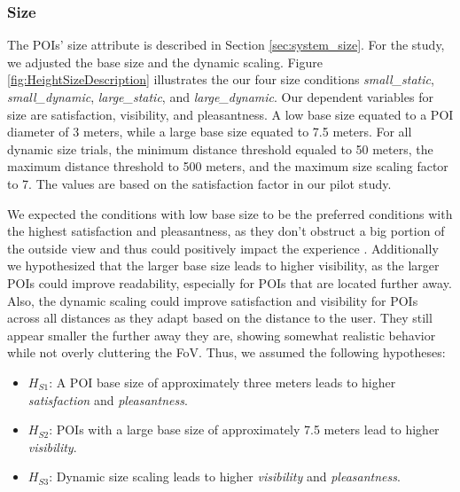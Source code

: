 \subsubsection*{\textbf{Size}}
The POIs' size attribute is described in Section \ref{sec:system_size}. For the study, we adjusted the base size and the dynamic scaling. Figure \ref{fig:HeightSizeDescription} illustrates the our four size conditions \textit{small\_static}, \textit{small\_dynamic}, \textit{large\_static}, and \textit{large\_dynamic}. Our dependent variables for size are satisfaction, visibility, and pleasantness. A low base size equated to a POI diameter of 3 meters, while a large base size equated to 7.5 meters. For all dynamic size trials, the minimum distance threshold equaled to 50 meters, the maximum distance threshold to 500 meters, and the maximum size scaling factor to 7. The values are based on the satisfaction factor in our pilot study.

We expected the conditions with low base size to be the preferred conditions with the highest satisfaction and pleasantness, as they don't obstruct a big portion of the outside view and thus could positively impact the experience \cite{BergerGridStudyInCarPassenger2021}. Additionally we hypothesized that the larger base size leads to higher visibility, as the larger POIs could improve readability, especially for POIs that are located further away. Also, the dynamic scaling could improve satisfaction and visibility for POIs across all distances as they adapt based on the distance to the user. They still appear smaller the further away they are, showing somewhat realistic behavior while not overly cluttering the FoV. Thus, we assumed the following hypotheses:
\begin{itemize}
    \item $H_{S1}$: A POI base size of approximately three meters leads to higher \textit{satisfaction} and \textit{pleasantness}.
    \item $H_{S2}$: POIs with a large base size of approximately 7.5 meters lead to higher \textit{visibility}.
    \item $H_{S3}$: Dynamic size scaling leads to higher \textit{visibility} and \textit{pleasantness}.
\end{itemize}



